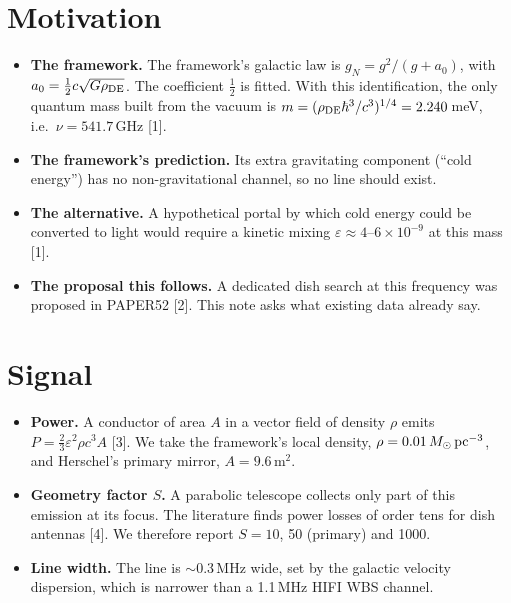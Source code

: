\documentclass[10pt]{article}
\begin{document}
\section{Motivation}
\begin{itemize}
\item \textbf{The framework.} The framework's galactic law is $g_N=g^2/(g+a_0)$, with $a_0=\tfrac12c\sqrt{G\rho_{\rm DE}}$. The coefficient $\tfrac12$ is fitted. With this identification, the only quantum mass built from the vacuum is $m=(\rho_{\rm DE}\hbar^3/c^3)^{1/4}=2.240$\,meV, i.e.\ $\nu=541.7$\,GHz [1].
\item \textbf{The framework's prediction.} Its extra gravitating component (``cold energy'') has no non-gravitational channel, so no line should exist.
\item \textbf{The alternative.} A hypothetical portal by which cold energy could be converted to light would require a kinetic mixing $\varepsilon\approx4$--$6\times10^{-9}$ at this mass [1].
\item \textbf{The proposal this follows.} A dedicated dish search at this frequency was proposed in PAPER52 [2]. This note asks what existing data already say.
\end{itemize}

\section{Signal}
\begin{itemize}
\item \textbf{Power.} A conductor of area $A$ in a vector field of density $\rho$ emits $P=\tfrac23\varepsilon^2\rho c^3A$ [3]. We take the framework's local density, $\rho=0.01\,M_\odot\,{\rm pc}^{-3}$, and Herschel's primary mirror, $A=9.6$\,m$^2$.
\item \textbf{Geometry factor $S$.} A parabolic telescope collects only part of this emission at its focus. The literature finds power losses of order tens for dish antennas [4]. We therefore report $S=10$, 50 (primary) and 1000.
\item \textbf{Line width.} The line is $\sim$0.3\,MHz wide, set by the galactic velocity dispersion, which is narrower than a 1.1\,MHz HIFI WBS channel.
\end{itemize}
\end{document}
